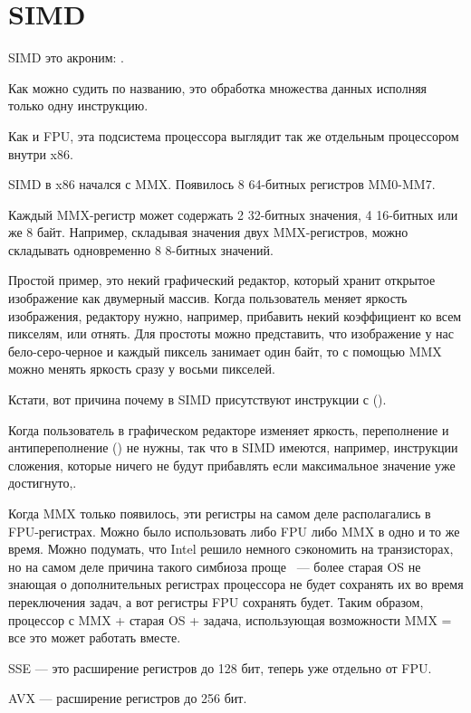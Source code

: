 \section{SIMD}

\label{SIMD_x86}
\ac{SIMD} это акроним: .

Как можно судить по названию, это обработка множества данных исполняя только одну инструкцию.

Как и \ac{FPU}, эта подсистема процессора выглядит так же отдельным процессором внутри x86.

SIMD в x86 начался с MMX. Появилось 8 64-битных регистров MM0-MM7.

Каждый MMX-регистр может содержать 2 32-битных значения, 4 16-битных или же 8 байт. 
Например, складывая значения двух MMX-регистров, можно складывать одновременно 8 8-битных значений.

Простой пример, это некий графический редактор, который хранит открытое изображение как двумерный массив. 
Когда пользователь меняет яркость изображения, редактору нужно, например, прибавить некий коэффициент 
ко всем пикселям, или отнять. 
Для простоты можно представить, что изображение у нас бело-серо-черное и каждый пиксель занимает один байт, 
то с помощью MMX можно менять яркость сразу у восьми пикселей.

Кстати, вот причина почему в SIMD присутствуют инструкции с  ().

Когда пользователь в графическом редакторе изменяет яркость, переполнение и антипереполнение ()
не нужны, так что в SIMD имеются, например, инструкции сложения, которые ничего не будут прибавлять
если максимальное значение уже достигнуто,\etc{}.

Когда MMX только появилось, эти регистры на самом деле располагались в FPU-регистрах. 
Можно было использовать 
либо FPU либо MMX в одно и то же время. Можно подумать, что Intel решило немного сэкономить на транзисторах, 
но на самом деле причина такого симбиоза проще ~--- более старая \ac{OS} не знающая о дополнительных 
регистрах процессора не будет сохранять их во время переключения задач, а вот регистры FPU сохранять будет. 
Таким образом, процессор с MMX + старая \ac{OS} + задача, использующая возможности MMX = все 
это может работать вместе.

SSE --- это расширение регистров до 128 бит, теперь уже отдельно от FPU.

AVX --- расширение регистров до 256 бит.

